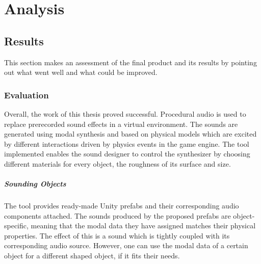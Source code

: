 \chapter{Analysis}\label{ch:analysis}

\section{Results}
This section makes an assessment of the final product and its results by pointing out what went well and what could be improved.  


\subsection{Evaluation}

Overall, the work of this thesis proved successful. Procedural audio is used to replace prerecorded sound effects in a virtual environment. The sounds are generated using modal synthesis and based on physical models which are excited by different interactions driven by physics events in the game engine. The tool implemented enables the sound designer to control the synthesizer by choosing different materials for every object, the roughness of its surface and size.

\paragraph{Sounding Objects}
\hfill \break

The tool provides ready-made Unity\textsuperscript{\textregistered} prefabs and their corresponding audio components attached. The sounds produced by the proposed prefabs are object-specific, meaning that the modal data they have assigned matches their physical properties. The effect of this is a sound which is tightly coupled with its corresponding audio source. However, one can use the modal data of a certain object for a different shaped object, if it fits their needs. 

